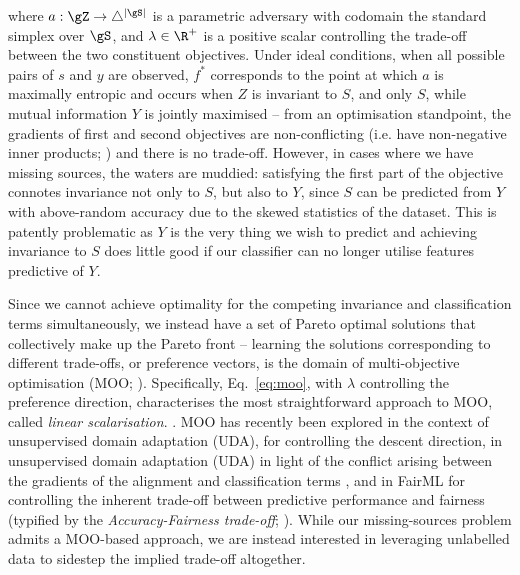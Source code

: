 %
where \( a: \gZ \to \bigtriangleup^{|\gS|} \) is a parametric adversary with codomain the standard
simplex over \( \gS \), and \(\lambda \in \R^+\) is a positive scalar controlling the trade-off
between the two constituent objectives. 
%
Under ideal conditions, when all possible pairs of \(s\) and \(y\) are observed, \(f^\ast\)
corresponds to the point at which \(a\) is maximally entropic and occurs when \(Z\) is invariant to
\(S\), and only \(S\), while mutual information \wrt{} \(Y\) is jointly maximised -- from an
optimisation standpoint, the gradients of first and second objectives are non-conflicting (i.e.
have non-negative inner products; \cite{yu2020gradient}) and there is no trade-off. 
%
However, in cases where we have missing sources, the waters are muddied: satisfying the first part
of the objective connotes invariance not only to \(S\), but also to \(Y\), since \(S\) can be
predicted from \(Y\) with above-random accuracy due to the skewed statistics of the dataset. 
%
This is patently problematic as \(Y\) is the very thing we wish to predict and achieving invariance
to \(S\) does little good if our classifier can no longer utilise features predictive of \(Y\). 

Since we cannot achieve optimality for the competing invariance and classification terms
simultaneously, we instead have a set of Pareto optimal solutions that collectively make up the
Pareto front -- learning the solutions corresponding to different trade-offs, or preference
vectors, is the domain of multi-objective optimisation (MOO; \citep{deb2014multi}). 
%
Specifically, Eq.~\ref{eq:moo}, with \(\lambda\) controlling the preference direction,
characterises the most straightforward approach to MOO, called \emph{linear scalarisation}.
\citep{boyd2004convex}. 
%
MOO has recently been explored in the context of unsupervised domain adaptation (UDA), for
controlling the descent direction, in unsupervised domain adaptation (UDA) in light of the conflict
arising between the gradients of the alignment and classification terms \citep{liang2021pareto},
and in FairML for controlling the inherent trade-off between predictive performance and fairness
(typified by the \emph{Accuracy-Fairness trade-off}; \citet{martinez2020minimax}). 
%
While our missing-sources problem admits a MOO-based approach, we are instead interested in
leveraging unlabelled data to sidestep the implied trade-off altogether.

